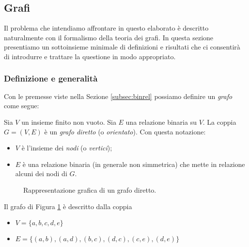 \subsection{Grafi}
Il problema che intendiamo affrontare in questo elaborato è descritto naturalmente con il formalismo della teoria dei grafi. In questa sezione presentiamo un sottoinsieme minimale di definizioni e risultati che ci consentirà di introdurre e trattare la questione in modo appropriato.

\subsubsection{Definizione e generalità}
Con le premesse viste nella Sezione \ref{subsec:binrel} possiamo definire un \emph{grafo} come segue:
\begin{definition}
    Sia $V$ un insieme finito non vuoto. Sia $E$ una relazione binaria su $V$. La coppia $G = (V, E)$ è un \emph{grafo diretto} (o \emph{orientato}). Con questa notazione:
    \begin{itemize}
        \item $V$ è l'insieme dei \emph{nodi} (o \emph{vertici});
        \item $E$ è una relazione binaria (in generale non simmetrica) che mette in relazione alcuni dei nodi di $G$.
    \end{itemize}
\end{definition}

\begin{example}
    \begin{figure}[t]
        \centering
        \caption{Rappresentazione grafica di un grafo diretto.}
        \label{fig:graph}
    \end{figure}
    Il grafo di Figura \ref{fig:graph} è descritto dalla coppia
    \begin{itemize}
        \item $V = \{a,b,c,d,e\}$
        \item $E = \{(a,b), (a,d), (b,c), (d,c), (c,e), (d,e)\}$
    \end{itemize}
\end{example}

